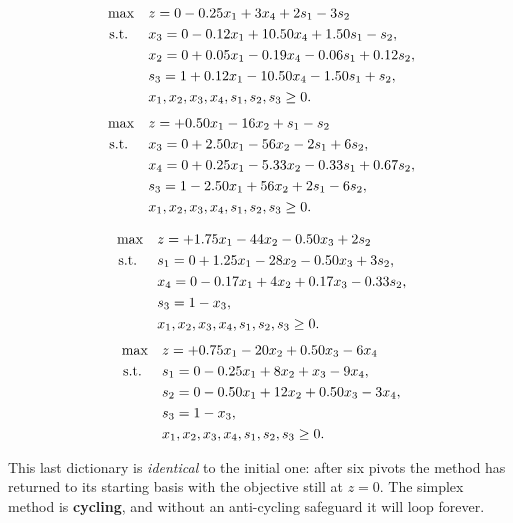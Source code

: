 \[
\begin{aligned}
\max \quad & z = 0 - 0.25x_1 + 3x_4 + 2s_1 - 3s_2 \\
\mbox{ s.t. } \quad 
& x_3 = 0 - 0.12x_1 + 10.50x_4 + 1.50s_1 - s_2, \\
& x_2 = 0 + 0.05x_1 - 0.19x_4 - 0.06s_1 + 0.12s_2, \\
& s_3 = 1 + 0.12x_1 - 10.50x_4 - 1.50s_1 + s_2, \\
& x_1, x_2, x_3, x_4, s_1, s_2, s_3 \geq 0.
\end{aligned}
\]
\[
\begin{aligned}
\max \quad & z = +0.50x_1 - 16x_2 + s_1 - s_2 \\
\mbox{ s.t. } \quad 
& x_3 = 0 + 2.50x_1 - 56x_2 - 2s_1 + 6s_2, \\
& x_4 = 0 + 0.25x_1 - 5.33x_2 - 0.33s_1 + 0.67s_2, \\
& s_3 = 1 - 2.50x_1 + 56x_2 + 2s_1 - 6s_2, \\
& x_1, x_2, x_3, x_4, s_1, s_2, s_3 \geq 0.
\end{aligned}
\]

\[
\begin{aligned}
\max \quad & z = +1.75x_1 - 44x_2 - 0.50x_3 + 2s_2 \\
\mbox{ s.t. } \quad 
& s_1 = 0 + 1.25x_1 - 28x_2 - 0.50x_3 + 3s_2, \\
& x_4 = 0 - 0.17x_1 + 4x_2 + 0.17x_3 - 0.33s_2, \\
& s_3 = 1 - x_3, \\
& x_1, x_2, x_3, x_4, s_1, s_2, s_3 \geq 0.
\end{aligned}
\]
\[
\begin{aligned}
\max \quad & z = +0.75x_1 - 20x_2 + 0.50x_3 - 6x_4 \\
\mbox{ s.t. } \quad 
& s_1 = 0 - 0.25x_1 + 8x_2 + x_3 - 9x_4, \\
& s_2 = 0 - 0.50x_1 + 12x_2 + 0.50x_3 - 3x_4, \\
& s_3 = 1 - x_3, \\
& x_1, x_2, x_3, x_4, s_1, s_2, s_3 \geq 0.
\end{aligned}
\]

\noindent This last dictionary is \emph{identical} to the initial one: after six pivots the method has returned to its starting basis with the objective still at $z=0$. The simplex method is \textbf{cycling}, and without an anti-cycling safeguard it will loop forever.


